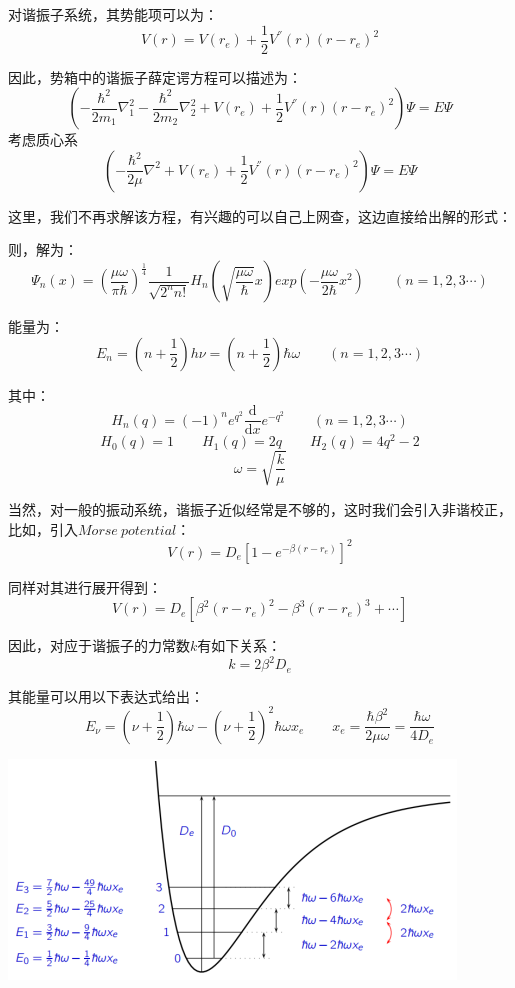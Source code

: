对谐振子系统，其势能项可以为：
\[V(r)=V(r_e)+\frac{1}{2}V^{''}(r)(r-r_e)^2\]

因此，势箱中的谐振子薛定谔方程可以描述为：
\[\left (-\frac{\hbar^2}{2m_1}\nabla^2_1-\frac{\hbar^2}{2m_2}\nabla^2_2+V(r_e)+\frac{1}{2}V^{''}(r)(r-r_e)^2 \right )\varPsi=E\varPsi\]
考虑质心系
\[\left (-\frac{\hbar^2}{2\mu}\nabla^2+V(r_e)+\frac{1}{2}V^{''}(r)(r-r_e)^2 \right )\varPsi=E\varPsi\]

这里，我们不再求解该方程，有兴趣的可以自己上网查，这边直接给出解的形式：

则，解为：
\[\varPsi_n(x)=\left(\frac{\mu\omega}{\pi\hbar}\right)^{\frac{1}{4}}\frac{1}{\sqrt{2^nn!}}H_n(\sqrt{\frac{\mu\omega}{\hbar}}x)exp\left(-\frac{\mu\omega}{2\hbar}x^2\right) \qquad (n=1,2,3 \cdots)\]

能量为：
\[E_n=\left(n+\frac{1}{2}\right)h\nu=\left(n+\frac{1}{2}\right)\hbar\omega \qquad (n=1,2,3\cdots)\]

其中：
\[H_n(q)=(-1)^ne^{q^2}\frac{\mathrm{d}}{\mathrm{d}x}e^{-q^2} \qquad (n=1,2,3\cdots)\]
\[H_0(q)=1 \qquad H_1(q)=2q \qquad H_2(q)=4q^2-2\]
\[\omega=\sqrt{\frac{k}{\mu}}\]

当然，对一般的振动系统，谐振子近似经常是不够的，这时我们会引入非谐校正，比如，引入$Morse \ potential$：
\[V(r)=D_e\left[1-e^{-\beta(r-r_e)}\right]^2\]

同样对其进行展开得到：
\[V(r)=D_e\left[\beta^2(r-r_e)^2-\beta^3(r-r_e)^3+\cdots\right]\]

因此，对应于谐振子的力常数$k$有如下关系：
\[k=2\beta^2D_e\]

其能量可以用以下表达式给出：
\[E_\nu=\left(\nu+\frac{1}{2}\right)\hbar\omega-\left(\nu+\frac{1}{2}\right)^2\hbar\omega x_e \qquad x_e=\frac{\hbar\beta^2}{2\mu\omega}=\frac{\hbar\omega}{4D_e}\]

\begin{center}
    \includegraphics[scale=0.7]{fig/lzhx/微信图片_20211104112141.png}
\end{center}

